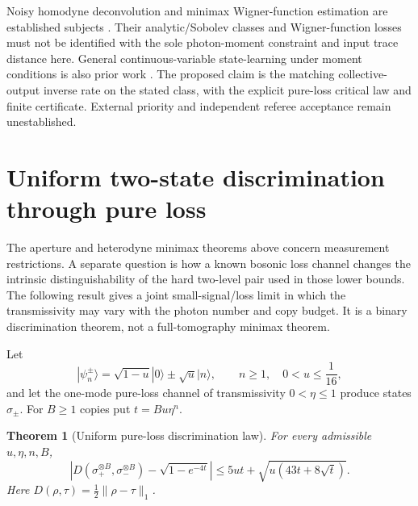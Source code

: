 \documentclass[11pt,a4paper]{article}
\newtheorem{theorem}{Theorem}[section]\newtheorem{proposition}[theorem]{Proposition}\newtheorem{corollary}[theorem]{Corollary}\newtheorem{lemma}[theorem]{Lemma}\newtheorem{remark}[theorem]{Remark}
\numberwithin{equation}{section}
\begin{document}
Noisy homodyne deconvolution and minimax Wigner-function estimation are
established subjects \cite{BGA2007,LMP2015}. Their analytic/Sobolev classes
and Wigner-function losses must not be identified with the sole photon-moment
constraint and input trace distance here. General continuous-variable
state-learning under moment conditions is also prior work \cite{Mele2025}.
The proposed claim is the matching collective-output inverse rate on the
stated class, with the explicit pure-loss critical law and finite certificate.
External priority and independent referee acceptance remain unestablished.

\section{Uniform two-state discrimination through pure loss}
\label{sec:pure-loss-discrimination}
The aperture and heterodyne minimax theorems above concern measurement
restrictions. A separate question is how a known bosonic loss channel changes
the intrinsic distinguishability of the hard two-level pair used in those
lower bounds. The following result gives a joint small-signal/loss limit in
which the transmissivity may vary with the photon number and copy budget.
It is a binary discrimination theorem, not a full-tomography minimax theorem.

Let
\[
 |\psi_n^\pm\rangle=\sqrt{1-u}|0\rangle\pm\sqrt u|n\rangle,
 \qquad n\ge1,\quad 0<u\le\frac1{16},
\]
and let the one-mode pure-loss channel of transmissivity
$0<\eta\le1$ produce states $\sigma_\pm$. For $B\ge1$ copies put
$t=Bu\eta^n$.

\begin{theorem}[Uniform pure-loss discrimination law]
\label{thm:pure-loss-uniform}
For every admissible $u,\eta,n,B$,
\[
\boxed{\left|
D(\sigma_+^{\otimes B},\sigma_-^{\otimes B})-
\sqrt{1-e^{-4t}}\right|
\le 5ut+\sqrt{u(43t+8\sqrt t)}.}
\tag{PL.1}\label{eq:pure-loss-bound}
\]
Here $D(\rho,\tau)=\tfrac12\|\rho-\tau\|_1$.
\end{theorem}
\end{document}
